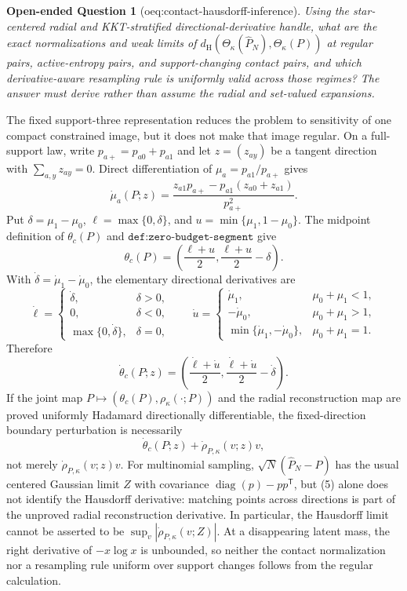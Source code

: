 \documentclass{article}
\newtheorem{openendedquestion}{Open-ended Question}
\begin{document}
\begin{openendedquestion}[oeq:contact-hausdorff-inference]\label{oeq:contact-hausdorff-inference}
Using the star-centered radial and KKT-stratified directional-derivative handle, what are the exact normalizations and weak limits of \(d_{\mathrm H}(\Theta_\kappa(\widehat P_N),\Theta_\kappa(P))\) at regular pairs, active-entropy pairs, and support-changing contact pairs, and which derivative-aware resampling rule is uniformly valid across those regimes? The answer must derive rather than assume the radial and set-valued expansions.
\end{openendedquestion}
The fixed support-three representation reduces the problem to sensitivity of one compact constrained image, but it does not make that image regular.  On a full-support law, write \(p_{a+}=p_{a0}+p_{a1}\) and let \(z=(z_{ay})\) be a tangent direction with \(\sum_{a,y}z_{ay}=0\).  Direct differentiation of \(\mu_a=p_{a1}/p_{a+}\) gives
\[
\dot\mu_a(P;z)=\frac{z_{a1}p_{a+}-p_{a1}(z_{a0}+z_{a1})}{p_{a+}^2}.
\tag{1}
\]
Put \(\delta=\mu_1-\mu_0\), \(\ell=\max\{0,\delta\}\), and \(u=\min\{\mu_1,1-\mu_0\}\).  The midpoint definition of \(\theta_c(P)\) and \(\texttt{def:zero-budget-segment}\) give
\[
\theta_c(P)=\left(\frac{\ell+u}{2},\frac{\ell+u}{2}-\delta\right).
\tag{2}
\]
With \(\dot\delta=\dot\mu_1-\dot\mu_0\), the elementary directional derivatives are
\[
\dot\ell=
\begin{cases}
\dot\delta,&\delta>0,\\
0,&\delta<0,\\
\max\{0,\dot\delta\},&\delta=0,
\end{cases}
\qquad
\dot u=
\begin{cases}
\dot\mu_1,&\mu_0+\mu_1<1,\\
-\dot\mu_0,&\mu_0+\mu_1>1,\\
\min\{\dot\mu_1,-\dot\mu_0\},&\mu_0+\mu_1=1.
\end{cases}
\tag{3}
\]
Therefore
\[
\dot\theta_c(P;z)=
\left(\frac{\dot\ell+\dot u}{2},
\frac{\dot\ell+\dot u}{2}-\dot\delta\right).
\tag{4}
\]
If the joint map \(P\mapsto(\theta_c(P),\rho_\kappa(\cdot;P))\) and the radial reconstruction map are proved uniformly Hadamard directionally differentiable, the fixed-direction boundary perturbation is necessarily
\[
\dot\theta_c(P;z)+\dot\rho_{P,\kappa}(v;z)v,
\tag{5}
\]
not merely \(\dot\rho_{P,\kappa}(v;z)v\).  For multinomial sampling, \(\sqrt N(\widehat P_N-P)\) has the usual centered Gaussian limit \(Z\) with covariance \(\operatorname{diag}(p)-pp^{\mathsf T}\), but (5) alone does not identify the Hausdorff derivative: matching points across directions is part of the unproved radial reconstruction derivative.  In particular, the Hausdorff limit cannot be asserted to be \(\sup_v|\dot\rho_{P,\kappa}(v;Z)|\).  At a disappearing latent mass, the right derivative of \(-x\log x\) is unbounded, so neither the contact normalization nor a resampling rule uniform over support changes follows from the regular calculation.
\end{document}
